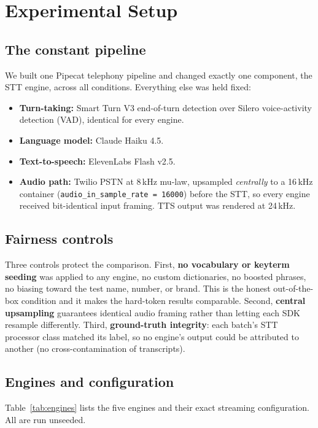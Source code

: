 \documentclass[11pt]{article}
\begin{document}
\section{Experimental Setup}
\label{sec:setup}

\subsection{The constant pipeline}
We built one Pipecat telephony pipeline and changed exactly one component, the
STT engine, across all conditions. Everything else was held fixed:

\begin{itemize}
  \item \textbf{Turn-taking:} Smart Turn V3 end-of-turn detection over Silero
        voice-activity detection (VAD), identical for every engine.
  \item \textbf{Language model:} Claude Haiku 4.5.
  \item \textbf{Text-to-speech:} ElevenLabs Flash v2.5.
  \item \textbf{Audio path:} Twilio PSTN at 8\,kHz mu-law, upsampled
        \emph{centrally} to a 16\,kHz container (\texttt{audio\_in\_sample\_rate
        = 16000}) before the STT, so every engine received bit-identical input
        framing. TTS output was rendered at 24\,kHz.
\end{itemize}

\subsection{Fairness controls}
Three controls protect the comparison. First, \textbf{no vocabulary or
keyterm seeding} was applied to any engine, no custom dictionaries, no boosted
phrases, no biasing toward the test name, number, or brand. This is the honest
out-of-the-box condition and it makes the hard-token results comparable.
Second, \textbf{central upsampling} guarantees identical audio framing rather
than letting each SDK resample differently. Third, \textbf{ground-truth
integrity}: each batch's STT processor class matched its label, so no engine's
output could be attributed to another (no cross-contamination of transcripts).

\subsection{Engines and configuration}
Table~\ref{tab:engines} lists the five engines and their exact streaming
configuration. All are run unseeded.
\end{document}
